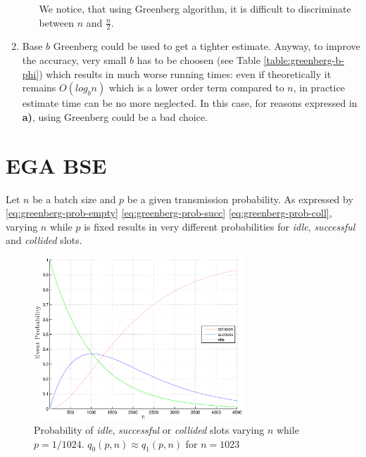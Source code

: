 \documentclass[11pt,a4paper,twoside,openright]{book}
\begin{document}
\begin{enumerate}[\bf a)]
\begin{enumerate}[\it i.]
\begin{itemize}
		\end{itemize}
		We notice, that using Greenberg algorithm, it is difficult to discriminate between $n$ and $\displaystyle \frac{n}{2}$. 
	\end{enumerate}
\item Base $b$ Greenberg could  be used to get a tighter estimate. Anyway, to improve the accuracy, very small $b$ has to be choosen (see Table \ref{table:greenberg-b-phi}) which results in much worse running times: even if theoretically it remains $O(log_{b}n)$ which is a lower order term compared to $n$, in practice estimate time can be no more neglected. In this case, for reasons expressed in {\bf a)}, using Greenberg  could be a bad choice.
\end{enumerate}

\section{EGA BSE}

Let $n$ be a batch size and $p$ be a given transmission probability. As expressed by \eqref{eq:greenberg-prob-empty} \eqref{eq:greenberg-prob-succ} \eqref{eq:greenberg-prob-coll}, varying $n$ while $p$ is fixed results in very different probabilities for \emph{idle}, \emph{successful} and \emph{collided} slots.

\begin{figure}[htbp]
\begin{center}
\includegraphics[width=0.7\textwidth]{matlab/Greenberg_MLE/draw_coll_idle_succ_fixed_p}
\caption[\emph{Basic Greenberg}: Event probability fixed $p$]{Probability of \emph{idle}, \emph{successful} or \emph{collided} slots varying $n$ while  $p=1/1024$.  $q_{0}(p,n) \approx  q_{1}(p,n)$ for $n=1023$}
\label{fg:event-prob-fixed-p-varying-n}
\end{center}
\end{figure}
\end{document}
